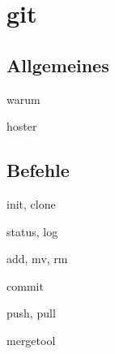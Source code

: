   \section{git}
    \subsection{Allgemeines}
      \begin{frame}{warum}
      \end{frame}

      \begin{frame}{hoster}
      \end{frame}

    \subsection{Befehle}
      \begin{frame}{init, clone}
      \end{frame}

      \begin{frame}{status, log}
      \end{frame}

      \begin{frame}{add, mv, rm}
      \end{frame}
      
      \begin{frame}{commit}
      \end{frame}
      
      \begin{frame}{push, pull}
      \end{frame}
      
      \begin{frame}{mergetool}
      \end{frame}